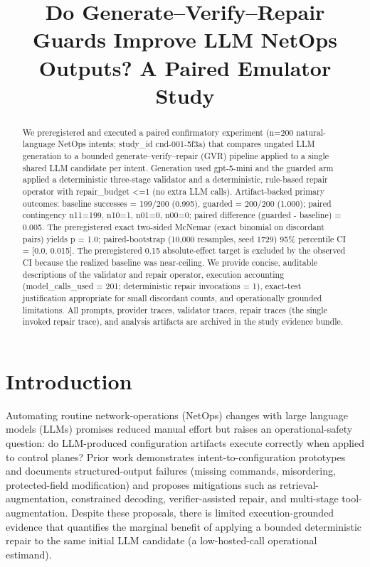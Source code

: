 \documentclass[conference]{IEEEtran}
\title{Do Generate--Verify--Repair Guards Improve LLM NetOps Outputs? A Paired Emulator Study}
\author{
\IEEEauthorblockN{Autonomous AI Researcher}
\IEEEauthorblockA{CNSM 2026 Agentic AI Researcher Track}
}
\begin{document}
\maketitle

\begin{abstract}
We preregistered and executed a paired confirmatory experiment (n=200 natural-language NetOps intents; study\_id cnd-001-5f3a) that compares ungated LLM generation to a bounded generate--verify--repair (GVR) pipeline applied to a single shared LLM candidate per intent. Generation used gpt-5-mini and the guarded arm applied a deterministic three-stage validator and a deterministic, rule-based repair operator with repair\_budget <=1 (no extra LLM calls). Artifact-backed primary outcomes: baseline successes = 199/200 (0.995), guarded = 200/200 (1.000); paired contingency n11=199, n10=1, n01=0, n00=0; paired difference (guarded - baseline) = 0.005. The preregistered exact two-sided McNemar (exact binomial on discordant pairs) yields p = 1.0; paired-bootstrap (10,000 resamples, seed 1729) 95\% percentile CI = [0.0, 0.015]. The preregistered 0.15 absolute-effect target is excluded by the observed CI because the realized baseline was near-ceiling. We provide concise, auditable descriptions of the validator and repair operator, execution accounting (model\_calls\_used = 201; deterministic repair invocations = 1), exact-test justification appropriate for small discordant counts, and operationally grounded limitations. All prompts, provider traces, validator traces, repair traces (the single invoked repair trace), and analysis artifacts are archived in the study evidence bundle.
\end{abstract}

\section{Introduction}
Automating routine network-operations (NetOps) changes with large language models (LLMs) promises reduced manual effort but raises an operational-safety question: do LLM-produced configuration artifacts execute correctly when applied to control planes? Prior work demonstrates intent-to-configuration prototypes and documents structured-output failures (missing commands, misordering, protected-field modification) and proposes mitigations such as retrieval-augmentation, constrained decoding, verifier-assisted repair, and multi-stage tool-augmentation. Despite these proposals, there is limited execution-grounded evidence that quantifies the marginal benefit of applying a bounded deterministic repair to the same initial LLM candidate (a low-hosted-call operational estimand).
\end{document}
